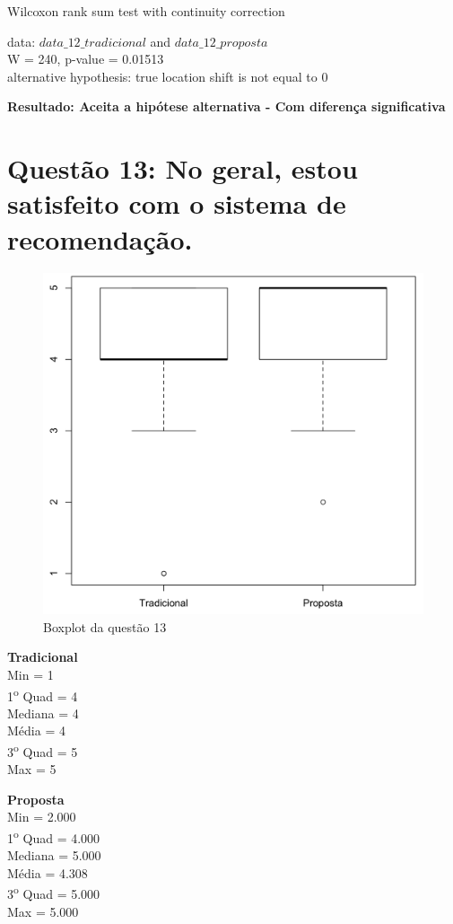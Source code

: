 Wilcoxon rank sum test with continuity correction

\noindent
data:  $data\_12\_tradicional$ and $data\_12\_proposta$\\
W = 240, p-value = 0.01513\\
alternative hypothesis: true location shift is not equal to 0

\noindent
\textbf{Resultado: Aceita a hipótese alternativa - Com diferença significativa}

\newpage
\section{Questão 13: No geral, estou satisfeito com o sistema de recomendação.}

\begin{figure}[htb]
  \caption{\label{fig:questao13-boxplot}Boxplot da questão 13}
  \begin{center}
      \includegraphics[scale=0.4]{./Figuras/questao13-boxplot.png}
  \end{center}
\end{figure}

\begin{multicols}{2}

\noindent\textbf{Tradicional}\\
Min = 1\\
1\textsuperscript{o} Quad = 4\\
Mediana = 4\\
Média = 4\\
3\textsuperscript{o} Quad = 5\\
Max = 5\\
\columnbreak

\noindent\textbf{Proposta}\\
Min = 2.000\\
1\textsuperscript{o} Quad = 4.000\\
Mediana = 5.000\\
Média = 4.308\\
3\textsuperscript{o} Quad = 5.000\\
Max = 5.000
\end{multicols}


